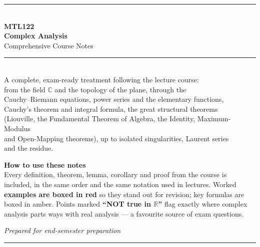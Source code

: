 \documentclass[11pt,openany]{report}
\newcommand{\C}{\mathbb{C}}
\newcommand{\R}{\mathbb{R}}
\begin{document}
\begin{titlepage}
\centering
\vspace*{2cm}
{\color{accentblue}\rule{\textwidth}{2pt}}\\[10pt]
{\Huge\bfseries\color{accentblue} MTL122\\[6pt] Complex Analysis}\\[10pt]
{\Large Comprehensive Course Notes}\\[6pt]
{\color{accentblue}\rule{\textwidth}{2pt}}\\[26pt]
{\large A complete, exam-ready treatment following the lecture course:\\[4pt]
from the field $\C$ and the topology of the plane, through the\\
Cauchy--Riemann equations, power series and the elementary functions,\\
Cauchy's theorem and integral formula, the great structural theorems\\
(Liouville, the Fundamental Theorem of Algebra, the Identity, Maximum-Modulus\\
and Open-Mapping theorems), up to isolated singularities, Laurent series\\
and the residue.}\\[36pt]

\begin{tcolorbox}[enhanced,width=0.85\textwidth,colback=keybg,colframe=keycol,
  arc=3pt,boxrule=1pt,halign=center]
{\large\bfseries How to use these notes}\\[4pt]
\small Every definition, theorem, lemma, corollary and proof from the course is
included, in the same order and the same notation used in lectures. Worked
\textbf{examples are boxed in red} so they stand out for revision; key formulas
are boxed in \colorbox{keybg}{amber}. Points marked \textbf{``NOT true in $\R$''}
flag exactly where complex analysis parts ways with real analysis --- a
favourite source of exam questions.
\end{tcolorbox}

\vfill
{\large\itshape Prepared for end-semester preparation}\\[4pt]
{\color{accentblue}\rule{0.5\textwidth}{1pt}}
\end{titlepage}

\tableofcontents
\thispagestyle{empty}
\clearpage

\end{document}
